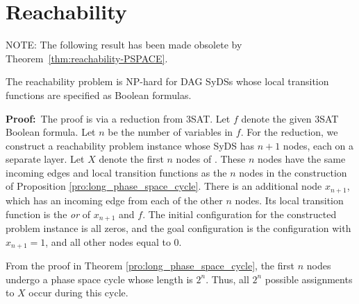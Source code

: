 \section{Reachability}
\label{sec:reachability}

\iffalse
\smallskip
\begin{theorem}\label{thm:reachability_bounded_levels}
Assuming that the node transition functions are given in a form 
that can be evaluated in polynomial time,
the reachability problem is solvable in polynomial time
for DAG SyDSs with a bounded number of levels.
\end{theorem}

\noindent
\textbf{Proof:}~ 
The algorithm can simulate the given SyDS for the number of steps specified in 
Theorem \ref{thm:levels_phase_space}.
\QED
\fi

\iffalse
\bigskip

NOTE: The following result has been made obsolete by 
Theorem~\ref{thm:reachability-PSPACE}.

\smallskip
\begin{theorem}\label{thm:reachability-NP}
The reachability problem is NP-hard for DAG SyDSs 
whose local transition functions are specified as Boolean formulas.
\end{theorem}

\noindent
\textbf{Proof:}~The proof is via a reduction from 3SAT.
Let $f$ denote the given 3SAT Boolean formula.
Let $n$ be the number of variables in $f$.
For the reduction, we construct a reachability problem instance whose SyDS \cals{} has $n+1$ nodes,
each on a separate layer.
Let $X$ denote the first $n$ nodes of \cals{}.
These $n$ nodes have the same incoming edges and local transition functions 
as the $n$ nodes in the construction of Proposition \ref{pro:long_phase_space_cycle}.
There is an additional node $x_{n+1}$,
which has an incoming edge from each of the other $n$  nodes.
Its local transition function is the {\em or} of $x_{n+1}$ and $f$.
The initial configuration \calc{} for the constructed problem instance is all zeros,
and the goal configuration \cald{} is the configuration with $x_{n+1} = 1$,
and all other nodes equal to 0.

From the proof in Theorem \ref{pro:long_phase_space_cycle}, 
the first $n$ nodes undergo a phase space cycle whose length is $2^n$.
Thus, all $2^n$ possible assignments to $X$ occur during this cycle.

